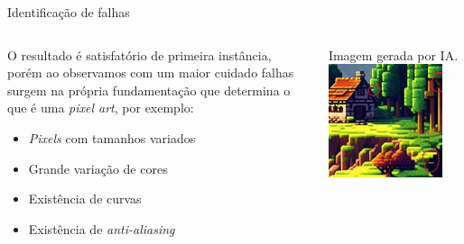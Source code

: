 \documentclass[compress,12pt]{beamer}
\begin{document}
\begin{frame}{Identificação de falhas}
	\begin{columns}
		\begin{column}{0.5\textwidth}
                O resultado é satisfatório de primeira instância, porém ao observamos com um maior cuidado falhas surgem na própria fundamentação que determina o que é uma \textit{pixel art}, por exemplo:
            \begin{itemize}
                \item \textit{Pixels} com tamanhos variados
                \item Grande variação de cores
                \item Existência de curvas
                \item Existência de \textit{anti-aliasing}
            \end{itemize}
			        
		\end{column}
		\begin{column}{0.5\textwidth}  %
			\begin{center}
                {Imagem gerada por IA.}    
				\includegraphics[width=0.85\textwidth]{Images/aiGeneratedPixelArt-1-P.jpeg}
			\end{center}
		\end{column}
	\end{columns}
\end{frame}
\end{document}
